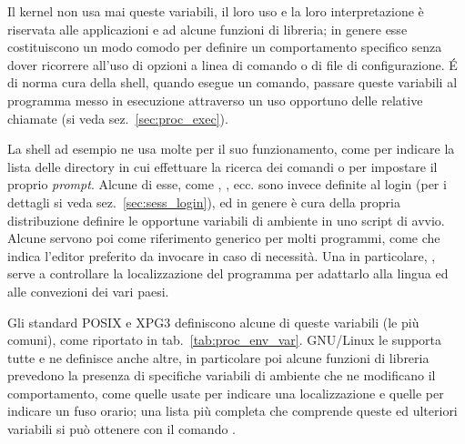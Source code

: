 Il kernel non usa mai queste variabili, il loro uso e la loro interpretazione è
riservata alle applicazioni e ad alcune funzioni di libreria; in genere esse
costituiscono un modo comodo per definire un comportamento specifico senza
dover ricorrere all'uso di opzioni a linea di comando o di file di
configurazione. É di norma cura della shell, quando esegue un comando, passare
queste variabili al programma messo in esecuzione attraverso un uso opportuno
delle relative chiamate (si veda sez.~\ref{sec:proc_exec}).

La shell ad esempio ne usa molte per il suo funzionamento, come 
per indicare la lista delle directory in cui effettuare la ricerca dei comandi
o  per impostare il proprio \textit{prompt}. Alcune di esse, come
, , ecc. sono invece definite al login (per i
dettagli si veda sez.~\ref{sec:sess_login}), ed in genere è cura della propria
distribuzione definire le opportune variabili di ambiente in uno script di
avvio. Alcune servono poi come riferimento generico per molti programmi, come
 che indica l'editor preferito da invocare in caso di
necessità. Una in particolare, , serve a controllare la
localizzazione del programma 
per adattarlo alla lingua ed alle convezioni
dei vari paesi.

Gli standard POSIX e XPG3 definiscono alcune di queste variabili (le più
comuni), come riportato in tab.~\ref{tab:proc_env_var}. GNU/Linux le supporta
tutte e ne definisce anche altre, in particolare poi alcune funzioni di
libreria prevedono la presenza di specifiche variabili di ambiente che ne
modificano il comportamento, come quelle usate per indicare una localizzazione
e quelle per indicare un fuso orario; una lista più completa che comprende
queste ed ulteriori variabili si può ottenere con il comando .

